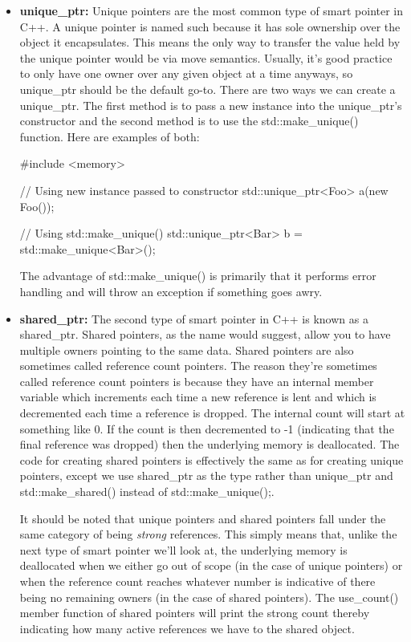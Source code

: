 \documentclass{article}
\begin{document}
\begin{itemize}

\item{%
    \textbf{unique\_ptr:} Unique pointers are the most common type of smart pointer in C++. A unique pointer
    is named such because it has sole ownership over the object it encapsulates. This means the only way to
    transfer the value held by the unique pointer would be via move semantics. Usually, it's good practice to
    only have one owner over any given object at a time anyways, so unique\_ptr should be the default go-to.
    There are two ways we can create a unique\_ptr. The first method is to pass a new instance into the
    unique\_ptr's constructor and the second method is to use the std::make\_unique() function. Here are
    examples of both:

    \begin{cpplst}
    #include <memory>

    // Using new instance passed to constructor
    std::unique_ptr<Foo> a(new Foo());

    // Using std::make_unique()
    std::unique_ptr<Bar> b = std::make_unique<Bar>();
    \end{cpplst}

    The advantage of std::make\_unique() is primarily that it performs error handling and will throw an
    exception if something goes awry.
}

\item{%
    \textbf{shared\_ptr:} The second type of smart pointer in C++ is known as a shared\_ptr. Shared pointers,
    as the name would suggest, allow you to have multiple owners pointing to the same data. Shared pointers
    are also sometimes called reference count pointers. The reason they're sometimes called reference count
    pointers is because they have an internal member variable which increments each time a new reference is
    lent and which is decremented each time a reference is dropped. The internal count will start at something
    like 0. If the count is then decremented to -1 (indicating that the final reference was dropped) then the
    underlying memory is deallocated. The code for creating shared pointers is effectively the same as for
    creating unique pointers, except we use shared\_ptr as the type rather than unique\_ptr and
    std::make\_shared() instead of std::make\_unique();.

    It should be noted that unique pointers and shared pointers fall under the same category of being
    \textit{strong} references. This simply means that, unlike the next type of smart pointer we'll look at,
    the underlying memory is deallocated when we either go out of scope (in the case of unique pointers) or
    when the reference count reaches whatever number is indicative of there being no remaining owners (in the
    case of shared pointers). The use\_count() member function of shared pointers will print the strong count
    thereby indicating how many active references we have to the shared object.

}
\end{itemize}
\end{document}
